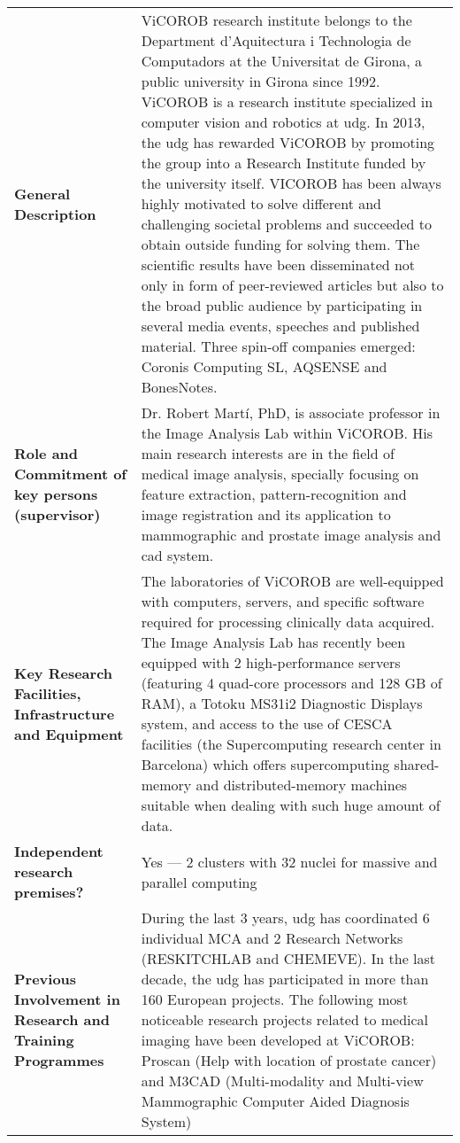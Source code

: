{\fontsize{9bp}{1em}\selectfont %
\noindent\begin{tabular}{>{\raggedright}p{}p{}}
  \multicolumn{2}{l}{\textbf{Beneficiary ViCOROB research institute (Universitat de Girona)}} \\\midrule
\textbf{General Description} &
ViCOROB research institute belongs to the Department d'Aquitectura i Technologia de Computadors at the Universitat de Girona, a public university in Girona since 1992. ViCOROB is a research institute specialized in computer vision and robotics at \ac{udg}. In 2013, the \ac{udg} has rewarded ViCOROB by promoting the group into a Research Institute funded by the university itself.
VICOROB has been always highly motivated to solve different and challenging  societal problems and succeeded to obtain outside funding for solving them. The scientific results have been disseminated not only in form of peer-reviewed articles but also to the broad public audience by participating in several media events, speeches and published material. Three spin-off companies emerged: Coronis Computing SL, AQSENSE and BonesNotes.
\\\midrule
\textbf{Role and Commitment of key persons (supervisor)} &
Dr. Robert Mart\'i, PhD, is associate professor in the Image Analysis Lab within ViCOROB. His main research interests are in the field of medical image analysis, specially focusing on feature extraction, pattern-recognition and image registration and its application to mammographic and prostate image analysis and \ac{cad} system.
\\\midrule
\textbf{Key Research Facilities, Infrastructure and Equipment} &
The laboratories of ViCOROB are well-equipped with computers, servers, and specific software required for processing clinically data acquired. The Image Analysis Lab has recently been equipped with 2 high-performance servers (featuring 4 quad-core processors and 128 GB of RAM), a Totoku MS31i2 Diagnostic Displays system, and access to the use of CESCA facilities (the Supercomputing research center in Barcelona) which offers supercomputing shared-memory and distributed-memory machines suitable when dealing with such huge amount of data.
\\\midrule
\textbf{Independent research premises?} &
Yes --- 2 clusters with 32 nuclei for massive and parallel computing
\\\midrule
\textbf{Previous Involvement in Research and Training Programmes} &
During the last 3 years, \ac{udg} has coordinated 6 individual MCA and 2 Research Networks (RESKITCHLAB and CHEMEVE). In the last decade, the \ac{udg} has participated in more than 160 European projects. The following most noticeable research projects related to medical imaging have been developed at ViCOROB: Proscan (Help with location of prostate cancer) and M3CAD (Multi-modality and Multi-view Mammographic Computer Aided Diagnosis System)

\end{tabular}}
